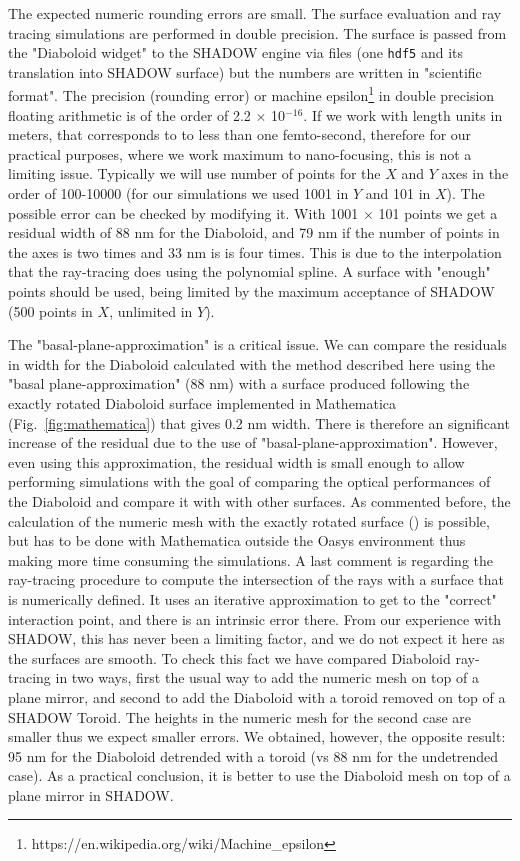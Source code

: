 \documentclass{iucr}              %
\begin{document}
 
The expected numeric rounding errors are small. The surface evaluation and ray tracing simulations are performed in double precision. The surface is passed from the "Diaboloid widget" to the SHADOW engine via files (one {\tt hdf5} and its translation into SHADOW surface) but the numbers are written in "scientific format". The precision (rounding error) or machine epsilon\footnote{ https://en.wikipedia.org/wiki/Machine\_epsilon} in double precision floating arithmetic is of the order of 2.2 $\times$ 10$^{-16}$. If we work with length units in meters, that corresponds to to less than one femto-second, therefore for our practical purposes, where we work maximum to nano-focusing, this is not a limiting issue. Typically we will use number of points for the $X$ and $Y$ axes in the order of 100-10000 (for our simulations we used 1001 in $Y$ and 101 in $X$). The possible error can be checked by modifying it. With 1001 $\times$ 101 points we get a residual width of 88 nm for the Diaboloid, and 79 nm if the number of points in the axes is two times and 33 nm is is four times. This is due to the interpolation that the ray-tracing does using the polynomial spline. A surface with "enough" points should be used, being limited by the maximum acceptance of SHADOW (500 points in $X$, unlimited in $Y$). 

The "basal-plane-approximation" is a critical issue. We can compare the residuals in width for the Diaboloid calculated with the method described here using the "basal plane-approximation" (88 nm) with a surface produced following the exactly rotated Diaboloid surface \cite{Valeriy2020b} implemented in Mathematica \cite{lacey}  (Fig.~\ref{fig:mathematica}) that gives 0.2 nm width. There is therefore an significant increase of the residual due to the use of "basal-plane-approximation". However, even using this approximation, the residual width is small enough to allow performing simulations with the goal of comparing the optical performances of the Diaboloid and compare it with with other surfaces. As commented before, the calculation of the numeric mesh with the exactly rotated surface (\cite{Valeriy2020b}) is possible, but has to be done with Mathematica outside the Oasys environment thus making more time consuming the simulations.  A last comment is regarding the ray-tracing procedure to compute the intersection of the rays with a surface that is numerically defined. It uses an iterative approximation to get to the "correct" interaction point, and there is an intrinsic error there. From our experience with SHADOW, this has never been a limiting factor, and we do not expect it here as the surfaces are smooth. To check this fact we have compared  Diaboloid ray-tracing in two ways, first the usual way to add the numeric mesh on top of a plane mirror, and second to add the Diaboloid with a toroid removed on top of a SHADOW Toroid. The heights in the numeric mesh for the second case are smaller thus we expect smaller errors. We obtained, however, the opposite result: 95 nm for the Diaboloid detrended with a toroid (vs 88 nm for the undetrended case). As a practical conclusion, it is better to use the Diaboloid mesh on top of a plane mirror in SHADOW.
\end{document}
